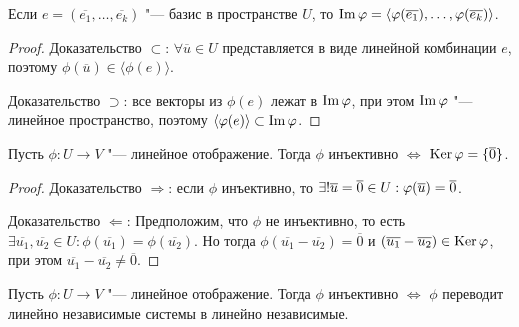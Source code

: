 \begin{proposition}
	Если $e = (\overline{e_1}, \dots ,\overline{e_k})$ "--- базис в пространстве $U$, то $\im{\phi} \hm{=} \langle\phi(\overline{e_1}), \dots, \phi(\overline{e_k})\rangle$.
\end{proposition}

\begin{proof}
	Доказательство $\subset$: $\forall \overline{u} \in U$ представляется в виде линейной комбинации $e$, поэтому $\phi(\overline{u}) \in \langle \phi(e)\rangle$.
	
	Доказательство $\supset$: все векторы из $\phi(e)$ лежат в $\operatorname{Im}{\varphi}$, при этом $\operatorname{Im}{\varphi}$ "--- линейное пространство, поэтому $\langle\varphi(e)\rangle \subset \operatorname{Im}{\varphi}$.
\end{proof}

\begin{proposition}
	Пусть $\phi: U \rightarrow V$ "--- линейное отображение. Тогда $\phi$ инъективно $\Leftrightarrow$ $\operatorname{Ker}{\varphi} = \{\overline{0}\}$.
\end{proposition}

\begin{proof}
	Доказательство $\Rightarrow$: если $\phi$ инъективно, то $\exists! \overline{u} \hm{=} \overline{0} \in U: \phi(\overline{u}) = \overline{0}$.
	
	Доказательство $\Leftarrow$: Предположим, что $\phi$ не инъективно, то есть $\exists \overline{u_1}, \overline{u_2} \in U: \phi(\overline{u_1}) = \phi(\overline{u_2})$. Но тогда $\phi(\overline{u_1} - \overline{u_2}) = \overline{0}$ и $(\overline{u_1} - \overline{u_2}) \hm{\in} \ke{\phi}$, при этом $\overline{u_1} - \overline{u_2} \ne \overline{0}$.
\end{proof}

\begin{proposition}
	Пусть $\phi: U \rightarrow V$ "--- линейное отображение. Тогда $\phi$ инъективно $\Leftrightarrow$ $\phi$ переводит линейно независимые системы в линейно независимые.
\end{proposition}

